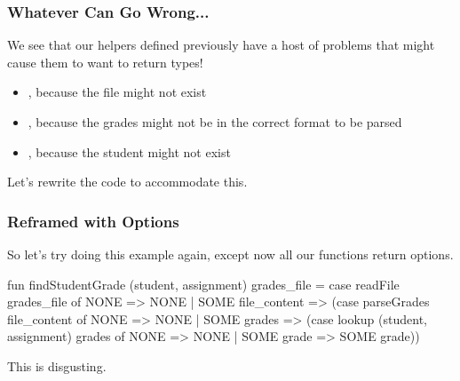 \documentclass[aspectratio=169]{beamer}
\begin{document}
\begin{frame}[fragile]
  \frametitle{Whatever Can Go Wrong...}

  We see that our helpers defined previously have a host of problems that
  might cause them to want to return  types!

  \pause
  \vspace{\fill}

  \begin{itemize}
    \item {}, because the file might not exist
    \item {}, because the grades might not be in the
    correct format to be parsed
    \item {}, because the student might not exist
  \end{itemize}

  \pause
  \vspace{\fill}

  Let's rewrite the code to accommodate this.
\end{frame}


\begin{frame}[fragile]
  \frametitle{Reframed with Options}

  So let's try doing this example again, except now all our functions return options.

  \pause
  \vspace{\fill}

  \begin{codeblock}
    fun findStudentGrade (student, assignment) grades_file =
      case readFile grades_file of
        NONE => NONE
      | SOME file_content =>
        (case parseGrades file_content of
          NONE => NONE
        | SOME grades =>
          (case lookup (student, assignment) grades of
            NONE => NONE
          | SOME grade => SOME grade))
  \end{codeblock}

  \pause
  \vspace{\fill}

  This is disgusting.
\end{frame}
\end{document}
